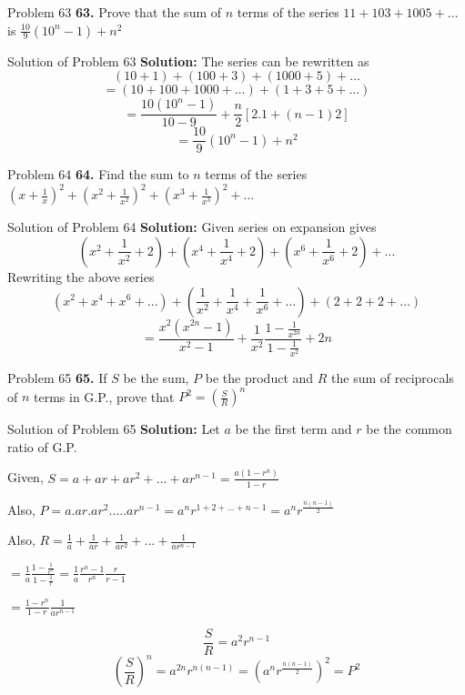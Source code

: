 \documentclass[aspectratio=1610,8pt]{beamer}
\begin{document}
\begin{frame}{Problem 63}
  \textbf{63.} Prove that the sum of $n$ terms of the series $11 + 103 + 1005+ \ldots$ is $\frac{10}{9}(10^n - 1) + n^2$
\end{frame}
\begin{frame}{Solution of Problem 63}
  \textbf{Solution:} The series can be rewritten as
  $$(10 + 1) + (100 + 3) + (1000 + 5) + \ldots$$
  $$= (10 + 100 + 1000 + \ldots) + (1 + 3 + 5 + \ldots)$$
  $$= \frac{10(10^n - 1)}{10 - 9} + \frac{n}{2}[2.1 + (n - 1)2]$$
  $$=\frac{10}{9}(10^n - 1) + n^2$$
\end{frame}
\begin{frame}{Problem 64}
  \textbf{64.} Find the sum to $n$ terms of the series $\left(x + \frac{1}{x}\right)^2 + \left(x^2 + \frac{1}{x^2}\right)^2 +
  \left(x^3 + \frac{1}{x^3}\right)^2 + \ldots$
\end{frame}
\begin{frame}{Solution of Problem 64}
  \textbf{Solution:} Given series on expansion gives
  $$\left(x^2 + \frac{1}{x^2} + 2\right) + \left(x^4 + \frac{1}{x^4} + 2\right) + \left(x^6 + \frac{1}{x^6} + 2\right) + \ldots$$
  Rewriting the above series
  $$(x^2 + x^4 + x^6 + \ldots) + \left(\frac{1}{x^2} + \frac{1}{x^4} + \frac{1}{x^6} + \ldots\right) + (2 + 2 + 2 + \ldots)$$
  $$= \frac{x^2(x^{2n} - 1)}{x^2 - 1} + \frac{1}{x^2}\frac{1 - \frac{1}{x^{2n}}}{1 - \frac{1}{x^2}} + 2n$$
\end{frame}
\begin{frame}{Problem 65}
  \textbf{65.} If $S$ be the sum, $P$ be the product and $R$ the sum of reciprocals of $n$ terms in G.P., prove that $P^2 =
  \left(\frac{S}{R}\right)^n$
\end{frame}
\begin{frame}{Solution of Problem 65}
  \textbf{Solution:} Let $a$ be the first term and $r$ be the common ratio of G.P.

  Given, $S = a + ar + ar^2 + \ldots + ar^{n - 1} = \frac{a(1 - r^n)}{1 - r}$

  Also, $P = a.ar.ar^2.\ldots .ar^{n - 1} = a^nr^{1 + 2 + \ldots + {n - 1}} = a^nr^{\frac{n(n - 1)}{2}}$

  Also, $R = \frac{1}{a} + \frac{1}{ar} + \frac{1}{ar^2} + \ldots + \frac{1}{ar^{n - 1}}$

  $= \frac{1}{a}\frac{1 - \frac{1}{r^n}}{1 - \frac{1}{r}} = \frac{1}{a}\frac{r^n - 1}{r^n}\frac{r}{r - 1}$

  $= \frac{1 - r^n}{1 - r}\frac{1}{ar^{n - 1}}$

  $$\frac{S}{R} = a^2r^{n - 1}$$
  $$\left(\frac{S}{R}\right)^n = a^{2n}r^{n(n - 1)} = (a^nr^{\frac{n(n - 1)}{2}})^2 = P^2$$
\end{frame}
\end{document}
